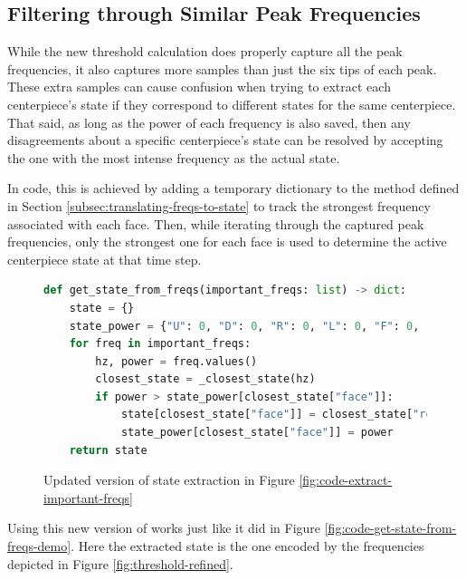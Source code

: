 \newpage
\subsection{Filtering through Similar Peak Frequencies}
\label{subsec:filtering-similar-peak-frequencies}
While the new threshold calculation does properly capture all the peak frequencies, it also captures more samples than just the six tips of each peak. 
These extra samples can cause confusion when trying to extract each centerpiece's state if they correspond to different states for the same centerpiece.
That said, as long as the power of each frequency is also saved, then any disagreements about a specific centerpiece's state can be resolved by accepting the one with the most intense frequency as the actual state.

In code, this is achieved by adding a temporary dictionary to the  method defined in Section \ref{subsec:translating-freqs-to-state} to track the strongest frequency associated with each face.
Then, while iterating through the captured peak frequencies, only the strongest one for each face is used to determine the active centerpiece state at that time step.

\begin{figure}[h]
\caption{Updated version of state extraction in Figure \ref{fig:code-extract-important-freqs}}
\label{fig:code-get-state-from-freqs-new}
\begin{lstlisting}[language=Python]
def get_state_from_freqs(important_freqs: list) -> dict:
    state = {}
    state_power = {"U": 0, "D": 0, "R": 0, "L": 0, "F": 0, "B": 0}  # New
    for freq in important_freqs:
        hz, power = freq.values()
        closest_state = _closest_state(hz)
        if power > state_power[closest_state["face"]]:              # New
            state[closest_state["face"]] = closest_state["rotation"]
            state_power[closest_state["face"]] = power              # New
    return state
\end{lstlisting}
\end{figure}

Using this new version of  works just like it did in Figure \ref{fig:code-get-state-from-freqs-demo}.
Here the extracted state is the one encoded by the frequencies depicted in Figure \ref{fig:threshold-refined}.

